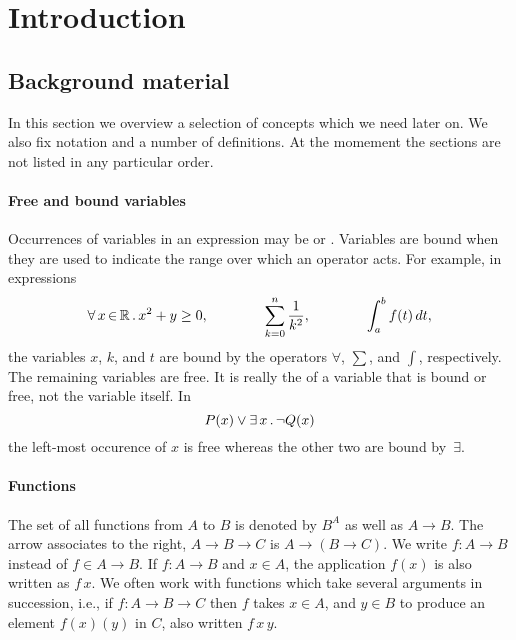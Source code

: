 \chapter{Introduction}
\label{chap:introduction}

\section{Background material}
\label{sec:background-material}

In this section we overview a selection of concepts which we need
later on. We also fix notation and a number of definitions. At the
momement the sections are not listed in any particular order.

\subsubsection*{Free and bound variables}

Occurrences of variables in an expression may be  or
. Variables are bound when they are used to indicate the
range over which an operator acts. For example, in expressions
%
\begin{equation*}
  \forall\, x \,{\in}\, \mathbb{R}\,.\,x^2 + y \geq 0,
  \qquad\qquad
  \sum_{k = 0}^n \frac{1}{k^2},
  \qquad\qquad
  \int_a^b f(t) \, dt,
\end{equation*}
%
the variables $x$, $k$, and $t$ are bound by the operators $\forall$,
$\sum$, and $\int$, respectively. The remaining variables are free. It
is really the  of a variable that is bound or free,
not the variable itself. In
%
\begin{equation*}
  P(x) \lor \exists\, x\,.\,\lnot Q(x)
\end{equation*}
%
the left-most occurence of $x$ is free whereas the other two are bound
by~$\exists$.

\subsubsection*{Functions}

The set of all functions from $A$ to $B$ is denoted by $B^A$ as well as $A \to B$. The arrow associates to the right,
$A \to B \to C$ is $A \to (B \to C)$. We write $f : A \to B$ instead of $f \in A \to B$. If $f : A \to B$ and $x \in A$, the application $f(x)$ is also written as $f\, x$. We often work with  functions which take several
arguments in succession, i.e., if $f : A \to B \to C$ then $f$ takes $x \in A$, and $y \in B$ to produce an element
$f(x)(y)$ in $C$, also written $f\, x\, y$.


